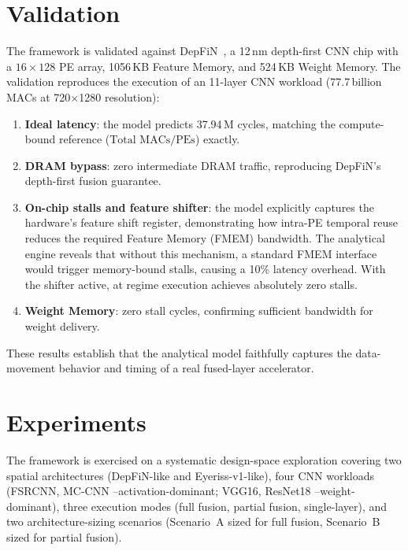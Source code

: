 \documentclass[11pt,a4paper,twocolumn]{article}
\begin{document}
\section*{Validation}

The framework is validated against DepFiN~\cite{goetschalckx2023depfin}, a 12\,nm depth-first
CNN chip with a $16 \times 128$ PE array, 1056\,KB Feature Memory,
and 524\,KB Weight Memory.
The validation reproduces the execution of an 11-layer CNN workload 
(77.7\,billion MACs at 720$\times$1280 resolution):

\begin{enumerate}
  \item \textbf{Ideal latency}: the model predicts 37.94\,M cycles,
        matching the compute-bound reference
        ($\text{Total MACs} / \text{PEs}$) exactly.
  \item \textbf{DRAM bypass}: zero intermediate DRAM traffic,
        reproducing DepFiN's depth-first fusion guarantee.
  \item \textbf{On-chip stalls and feature shifter}: the model explicitly captures the hardware's feature shift register, demonstrating how intra-PE temporal reuse reduces the required Feature Memory (FMEM) bandwidth. The analytical engine reveals that without this mechanism, a standard FMEM interface would trigger memory-bound stalls, causing a 10\% latency overhead. With the shifter active, at regime execution achieves absolutely zero stalls.
  \item \textbf{Weight Memory}: zero stall cycles, confirming
        sufficient bandwidth for weight delivery.
\end{enumerate}

\noindent
These results establish that the analytical model faithfully captures
the data-movement behavior and timing of a real fused-layer
accelerator.


\section*{Experiments}

The framework is exercised on a systematic design-space
exploration covering two spatial architectures (DepFiN-like and Eyeriss-v1-like), four CNN workloads (FSRCNN, MC-CNN --activation-dominant;
VGG16, ResNet18 --weight-dominant), three execution modes (full
fusion, partial fusion, single-layer), and two architecture-sizing
scenarios (Scenario~A sized for full fusion, Scenario~B sized for
partial fusion).
\end{document}
